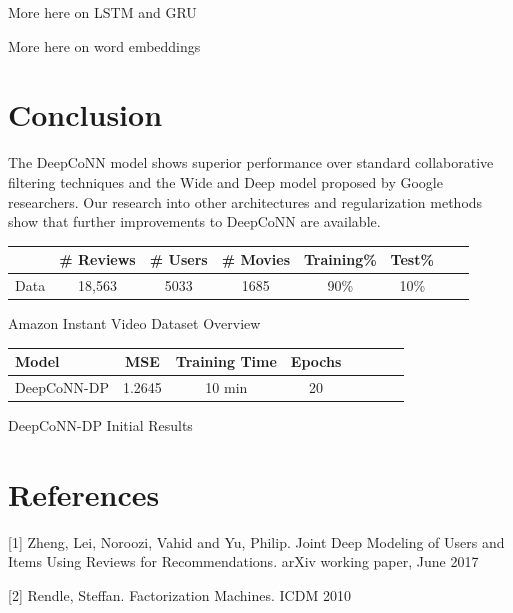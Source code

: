 \documentclass[10pt,twocolumn,letterpaper]{article}
\begin{document}
More here on LSTM and GRU

More here on word embeddings

\section{Conclusion}

The DeepCoNN model shows superior performance over standard collaborative filtering techniques and the Wide and Deep model proposed by Google researchers. Our research into other architectures and regularization methods show that further improvements to DeepCoNN are available.   


\begin{exhibit}
\begin{center}
{\small
\begin{tabular}{l|ccccccc}
\hline
 & \# Reviews & \# Users & \# Movies & Training\% & Test\% \\
\hline
Data & 18,563  & 5033 & 1685 & 90\% & 10\%  \\
\hline
\end{tabular}
}
\end{center}
\caption{Amazon Instant Video Dataset Overview}
\end{exhibit}

\begin{exhibit}
\begin{center}
{\small
\begin{tabular}{l|ccccccc}
\hline
Model & MSE & Training Time & Epochs \\
\hline
DeepCoNN-DP & 1.2645 & 10 min & 20  \\
\hline
\end{tabular}
}
\end{center}
\caption{DeepCoNN-DP Initial Results}
\end{exhibit}


\section{References}

[1] Zheng, Lei, Noroozi, Vahid and Yu, Philip. Joint Deep Modeling of Users
 and Items Using Reviews for Recommendations. arXiv working paper, June 2017

[2] Rendle, Steffan. Factorization Machines. ICDM 2010
\end{document}
